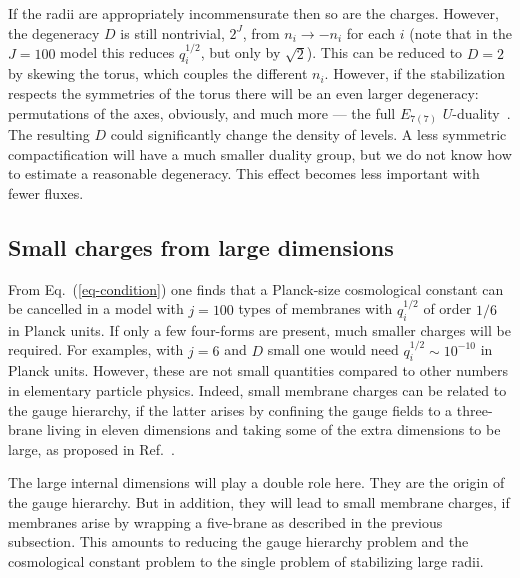 \documentclass[12pt]{article}
\begin{document}
If the radii are appropriately incommensurate then so are the charges.
However, the degeneracy $D$ is still nontrivial, $2^J$, from $n_i \to
-n_i$ for each $i$ (note that in the $J=100$ model this reduces
$q_i^{1/2}$, but only by $\sqrt 2$).  This can be reduced to $D=2$ by
skewing the torus, which couples the different $n_i$.  However, if the
stabilization respects the symmetries of the torus there will be an
even larger degeneracy: permutations of the axes, obviously, and much
more --- the full $E_{7(7)}$ $U$-duality~\cite{HulTow95}.  The
resulting $D$ could significantly change the density of levels.  A
less symmetric compactification will have a much smaller duality
group, but we do not know how to estimate a reasonable degeneracy.
This effect becomes less important with fewer fluxes.

\subsection{Small charges from large dimensions}

From Eq.~(\ref{eq-condition}) one finds that a Planck-size
cosmological constant can be cancelled in a model with $j = 100$ types
of membranes with $q_i^{1/2}$ of order $1/6$ in Planck units.  If only
a few four-forms are present, much smaller charges will be required.
For examples, with $j=6$ and $D$ small one would need $q_i^{1/2} \sim
10^{-10} $ in Planck units.  However, these are not small quantities
compared to other numbers in elementary particle physics.  Indeed,
small membrane charges can be related to the gauge hierarchy, if the
latter arises by confining the gauge fields to a three-brane living in
eleven dimensions and taking some of the extra dimensions to be large,
as proposed in Ref.~\cite{ArkDim98}.

The large internal dimensions will play a double role here.  They are
the origin of the gauge hierarchy.  But in addition, they will lead to
small membrane charges, if membranes arise by wrapping a five-brane as
described in the previous subsection.  This amounts to reducing the
gauge hierarchy problem and the cosmological constant problem to the
single problem of stabilizing large radii.
\end{document}
